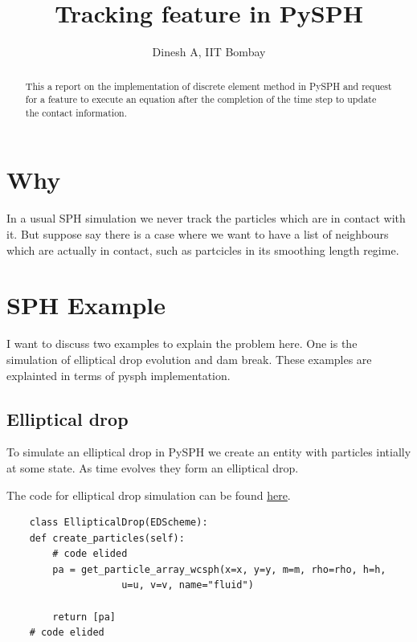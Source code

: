 \documentclass[11pt]{article}
\date{}
\title{}
\begin{document}
\title{\sffamily \textbf{Tracking feature in PySPH}}

\author{Dinesh A, IIT Bombay}

\maketitle


\begin{abstract}
  This a report on the implementation of discrete element method in PySPH and
  request for a feature to execute an equation after the completion of the time
  step to update the contact information.
\end{abstract}

\section{Why}
\label{sec:orga808eee}
In a usual SPH simulation we never track the particles which are in contact
with it.  But suppose say there is a case where we want to have a list of
neighbours which are actually in contact, such as partcicles in its smoothing
length regime.


\section{SPH Example}
\label{sec:org2983fc2}
I want to discuss two examples to explain the problem here. One is the
simulation of elliptical drop evolution and dam break. These
examples are explainted in terms of pysph implementation.


\subsection{Elliptical drop}
\label{sec:orgab93f58}
To simulate an elliptical drop in PySPH we create an entity with particles
intially at some state. As time evolves they form an elliptical drop.

The code for elliptical drop simulation can be found \href{https://github.com/pypr/pysph/blob/master/pysph/examples/elliptical\_drop\_no\_scheme.py}{here}.

\begin{verbatim}
    class EllipticalDrop(EDScheme):
	def create_particles(self):
	    # code elided
	    pa = get_particle_array_wcsph(x=x, y=y, m=m, rho=rho, h=h,
					u=u, v=v, name="fluid")

	    return [pa]
	# code elided
\end{verbatim}
\end{document}
